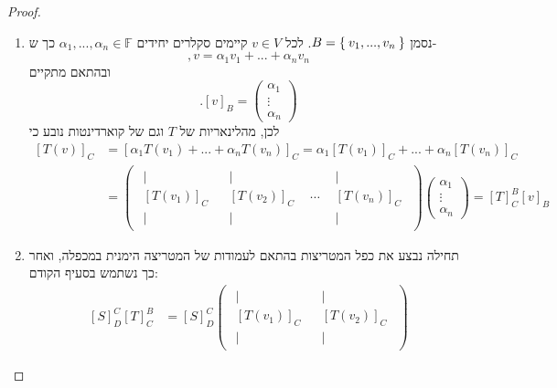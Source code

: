 \documentclass[12pt]{report}
\theoremstyle{plain}
\theoremstyle{definition}
\newcommand{\F}{\mathbb{F}}
\newcommand{\0}{\mathbf{0}}
\begin{document}
\begin{proof}\
\begin{enumerate}[label=\alph*.]
\item
נסמן
$B=\Set{v_1,...,v_n}$.
לכל
$v\in V$
קיימים סקלרים יחידים
$\alpha_1,...,\alpha_n\in\F$
כך ש-
$$
,v=\alpha_1 v_1+...+\alpha_n v_n
$$
ובהתאם מתקיים
$$
.[v]_B=\begin{pmatrix}\alpha_1\\\vdots\\\alpha_n\end{pmatrix}
$$
לכן, מהלינאריות של
$T$
וגם של קוארדינטות נובע כי
$$
\begin{aligned}
[T(v)]_C&=[\alpha_1T(v_1)+...+\alpha_nT(v_n)]_C=\alpha_1[T(v_1)]_C+...+\alpha_n[T(v_n)]_C \\
&=\begin{pmatrix}
\begin{array}{c}
|\\[-0.4ex]
[T(v_1)]_C\\[-0.4ex]
|
\end{array}
&
\begin{array}{c}
|\\[-0.4ex]
[T(v_2)]_C\\[-0.4ex]
|
\end{array}
&
\cdots
&
\begin{array}{c}
|\\[-0.4ex]
[T(v_n)]_C\\[-0.4ex]
|
\end{array}
\end{pmatrix}
\begin{pmatrix}\alpha_1\\\vdots\\\alpha_n\end{pmatrix}=[T]_C^B[v]_B
\end{aligned}
$$
\item 
תחילה נבצע את כפל המטריצות בהתאם לעמודות של המטריצה הימנית במכפלה, ואחר כך נשתמש בסעיף הקודם:
$$
\begin{aligned}
[S]_D^C[T]_C^B&=[S]_D^C\begin{pmatrix}
\begin{array}{c}
|\\[-0.4ex]
[T(v_1)]_C\\[-0.4ex]
|
\end{array}
&
\begin{array}{c}
|\\[-0.4ex]
[T(v_2)]_C\\[-0.4ex]
|
\end{array}

\end{pmatrix}
\end{aligned}$$
\end{enumerate}
\end{proof}
\end{document}

